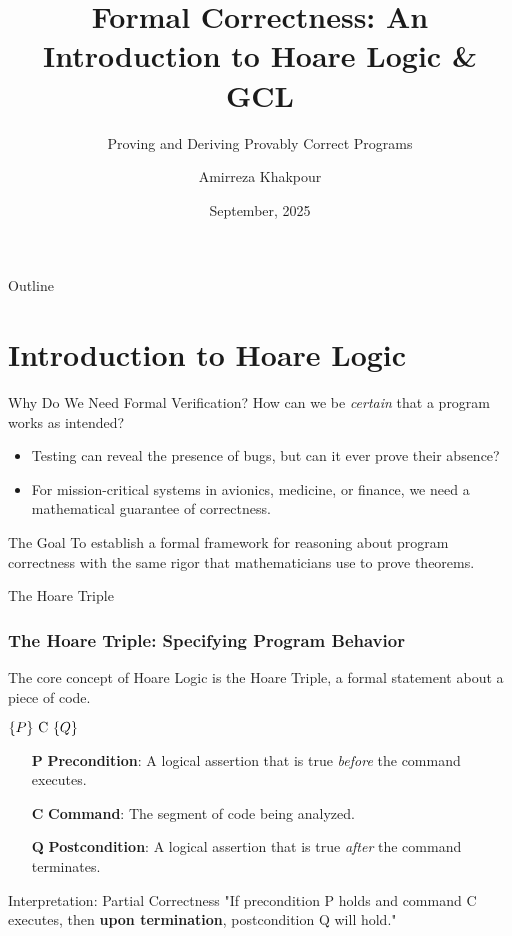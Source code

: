 \documentclass[aspectratio=169]{beamer}
\title{Formal Correctness: An Introduction to Hoare Logic \& GCL}
\subtitle{Proving and Deriving Provably Correct Programs}
\date{September, 2025}
\author{Amirreza Khakpour}
\newcommand{\code}[1]{\lstinline|#1|}
\newcommand{\hoare}[3]{\ensuremath{\{#1\}\ \code{#2}\ \{#3\}}}
\begin{document}
\begin{frame}
    \titlepage
\end{frame}

\begin{frame}{Outline}
    \tableofcontents
\end{frame}

\section{Introduction to Hoare Logic}

\begin{frame}{Why Do We Need Formal Verification?}
    \Large
    How can we be \textit{certain} that a program works as intended?
    \vspace{1cm}
    \normalsize
    \pause
    \begin{itemize}
        \item Testing can reveal the presence of bugs, but can it ever prove their absence?
        \pause
        \item For mission-critical systems in avionics, medicine, or finance, we need a mathematical guarantee of correctness.
    \end{itemize}
    \vfill
    \pause
    \begin{alertblock}{The Goal}
        To establish a formal framework for reasoning about program correctness with the same rigor that mathematicians use to prove theorems.
    \end{alertblock}
\end{frame}

\begin{frame}{The Hoare Triple}
    \frametitle{The Hoare Triple: Specifying Program Behavior}
    The core concept of Hoare Logic is the Hoare Triple, a formal statement about a piece of code.
    \vfill
    \begin{center}
        \Huge \hoare{P}{C}{Q}
    \end{center}
    \vfill
    \begin{itemize}
        \item[\textbf{P}] \textbf{Precondition}: A logical assertion that is true \textit{before} the command executes. \pause
        \item[\textbf{C}] \textbf{Command}: The segment of code being analyzed. \pause
        \item[\textbf{Q}] \textbf{Postcondition}: A logical assertion that is true \textit{after} the command terminates.
    \end{itemize}
    \vfill
    \pause
    \begin{block}{Interpretation: Partial Correctness}
        "If precondition P holds and command C executes, then \textbf{upon termination}, postcondition Q will hold."
    \end{block}
\end{frame}
\end{document}
